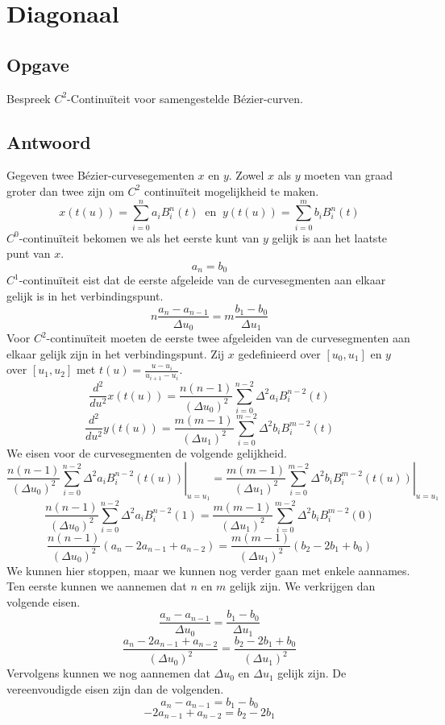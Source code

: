\documentclass[examenvragen.tex]{subfiles}
\begin{document}
\section{Diagonaal}
\subsection{Opgave}
Bespreek $C^{2}$-Continu\"iteit voor samengestelde B\'ezier-curven.

\subsection{Antwoord}
Gegeven twee B\'ezier-curvesegementen $x$ en $y$. Zowel $x$ als $y$ moeten van graad groter dan twee zijn om $C^{2}$ continu\"iteit mogelijkheid te maken.
\[
x(t(u)) = \sum_{i=0}^{n}a_{i}B_{i}^{n}(t)\ \text{ en }\ 
y(t(u)) = \sum_{i=0}^{m}b_{i}B_{i}^{n}(t)
\]
$C^{0}$-continu\"iteit bekomen we als het eerste kunt van $y$ gelijk is aan het laatste punt van $x$. 
\[
a_n = b_0
\]
$C^{1}$-continu\"iteit eist dat de eerste afgeleide van de curvesegmenten aan elkaar gelijk is in het verbindingspunt. 
\[
n\frac{a_{n}-a_{n-1}}{\Delta u_0} = m\frac{b_1-b_0}{\Delta u_1}
\]
Voor $C^{2}$-continu\"iteit moeten de eerste twee afgeleiden van de curvesegmenten aan elkaar gelijk zijn in het verbindingspunt.
Zij $x$ gedefinieerd over $[u_0,u_1]$ en $y$ over $[u_1,u_2]$ met $t(u) = \frac{u-u_i}{u_{i+1}-u_i}$.
\[
\frac{d^2}{du^2}x(t(u)) = \frac{n(n-1)}{(\Delta u_0)^2}\sum_{i=0}^{n-2}\Delta^2a_iB_{i}^{n-2}(t)
\]
\[
\frac{d^2}{du^2}y(t(u)) = \frac{m(m-1)}{(\Delta u_1)^2}\sum_{i=0}^{m-2}\Delta^2b_iB_{i}^{m-2}(t)
\]
We eisen voor de curvesegmenten de volgende gelijkheid.
\[
\left.\frac{n(n-1)}{(\Delta u_0)^2}\sum_{i=0}^{n-2}\Delta^2a_iB_{i}^{n-2}(t(u))\right|_{u=u_1}
=
\left.\frac{m(m-1)}{(\Delta u_1)^2}\sum_{i=0}^{m-2}\Delta^2b_iB_{i}^{m-2}(t(u))\right|_{u=u_1}
\]
\[
\frac{n(n-1)}{(\Delta u_0)^2}\sum_{i=0}^{n-2}\Delta^2a_iB_{i}^{n-2}(1)
=
\frac{m(m-1)}{(\Delta u_1)^2}\sum_{i=0}^{m-2}\Delta^2b_iB_{i}^{m-2}(0)
\]
\[
\frac{n(n-1)}{(\Delta u_0)^2}(a_{n}-2a_{n-1}+a_{n-2})
=
\frac{m(m-1)}{(\Delta u_1)^2}(b_{2}-2b_{1}+b_{0})
\]
We kunnen hier stoppen, maar we kunnen nog verder gaan met enkele aannames.
Ten eerste kunnen we aannemen dat $n$ en $m$ gelijk zijn. We verkrijgen dan volgende eisen.
\[
\frac{a_{n}-a_{n-1}}{\Delta u_0} = \frac{b_1-b_0}{\Delta u_1}
\]
\[
\frac{a_{n}-2a_{n-1}+a_{n-2}}{(\Delta u_0)^2}
=
\frac{b_{2}-2b_{1}+b_{0}}{(\Delta u_1)^2}
\]
Vervolgens kunnen we nog aannemen dat $\Delta u_0$ en $\Delta u_1$ gelijk zijn. De vereenvoudigde eisen zijn dan de volgenden.
\[
a_{n}-a_{n-1} = b_1-b_0
\]
\[
-2a_{n-1}+a_{n-2}
=
b_{2}-2b_{1}
\]
\end{document}

